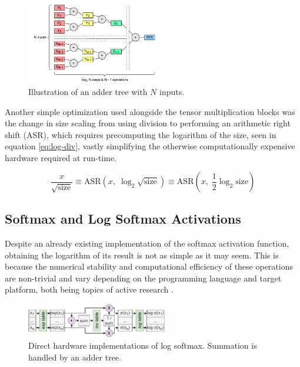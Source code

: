 \begin{figure}[hpt!]
  \centering
  \includegraphics[trim={0cm 0cm 0cm 0cm}, width=0.51\textwidth, center]{quantization/adder_tree.pdf}
  \caption{Illustration of an adder tree with \(N\) inputs.}
  \label{fig:adder-tree}
\end{figure}

Another simple optimization used alongside the tensor multiplication blocks was the change in size scaling from using division to performing an arithmetic right shift (ASR), which requires precomputing the logarithm of the size, seen in equation \ref{eq:log-div}, vastly simplifying the otherwise computationally expensive hardware required at run-time.

\begin{equation}\label{eq:log-div}
  \frac{x}{\sqrt{\text{size}}} \equiv \text{ASR}(x,\; \log_2 \sqrt{\text{size}}) \equiv \text{ASR}(x,\; \frac{1}{2}\log_2 \text{size})
\end{equation}


\subsection{Softmax and Log Softmax Activations}\label{log-softmax}
Despite an already existing \hlsml implementation of the softmax activation function, obtaining the logarithm of its result is not as simple as it may seem. This is because the numerical stability and computational efficiency of these operations are non-trivial and vary depending on the programming language and target platform, both being topics of active research \cite{60-blanchard2019accurate,94-wei2020design}.

\begin{figure}[hpt!]
  \centering
  \includegraphics[trim={0cm 0cm 0cm 0cm}, width=0.55\textwidth, center]{quantization/log_softmax_naive_h.pdf}
  \caption{Direct hardware implementations of log softmax. Summation is handled by an adder tree.}
  \label{fig:log-softmax-naive}
\end{figure}

